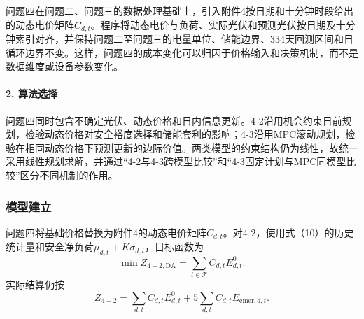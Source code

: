 \documentclass{cumcmthesis}
\newcommand{\Tset}{\mathcal{T}}
\begin{document}
问题四在问题二、问题三的数据处理基础上，引入附件4按日期和十分钟时段给出的动态电价矩阵$C_{d,t}$。程序将动态电价与负荷、实际光伏和预测光伏按日期及十分钟索引对齐，并保持问题二至问题三的电量单位、储能边界、334天回测区间和日循环边界不变。这样，问题四的成本变化可以归因于价格输入和决策机制，而不是数据维度或设备参数变化。

\paragraph{2. 算法选择}

问题四同时包含不确定光伏、动态价格和日内信息更新。4-2沿用机会约束日前规划，检验动态价格对安全裕度选择和储能套利的影响；4-3沿用MPC滚动规划，检验在相同动态价格下预测更新的边际价值。两类模型的约束结构仍为线性，故统一采用线性规划求解，并通过“4-2与4-3跨模型比较”和“4-3固定计划与MPC同模型比较”区分不同机制的作用。

\subsubsection{模型建立}

问题四将基础价格替换为附件4的动态电价矩阵$C_{d,t}$。对4-2，使用式（10）的历史统计量和安全净负荷$\mu_{d,t}+K\sigma_{d,t}$，目标函数为
\begin{equation}
\min Z_{4-2,\mathrm{DA}}=\sum_{t\in\Tset}C_{d,t}E^0_{d,t}.
\tag{24}
\end{equation}
实际结算仍按
\begin{equation}
Z_{4-2}=\sum_{d,t}C_{d,t}E^0_{d,t}+5\sum_{d,t}C_{d,t}E_{\mathrm{emer},d,t}.
\tag{25}
\end{equation}
\end{document}
